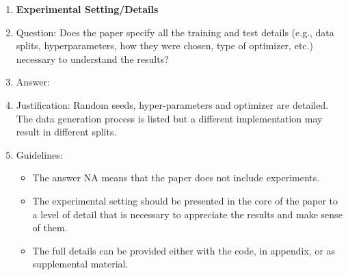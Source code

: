 \documentclass{article}
\theoremstyle{plain}
\theoremstyle{definition}
\theoremstyle{remark}
\begin{document}
\begin{enumerate}
\item {\bf Experimental Setting/Details}
    \item[] Question: Does the paper specify all the training and test details (e.g., data splits, hyperparameters, how they were chosen, type of optimizer, etc.) necessary to understand the results?
    \item[] Answer: \answerYes{} %
    \item[] Justification: Random seeds, hyper-parameters and optimizer are detailed. The data generation process is listed but a different implementation may result in different splits. 
    \item[] Guidelines:
    \begin{itemize}
        \item The answer NA means that the paper does not include experiments.
        \item The experimental setting should be presented in the core of the paper to a level of detail that is necessary to appreciate the results and make sense of them.
        \item The full details can be provided either with the code, in appendix, or as supplemental material.
    \end{itemize}


\end{enumerate}
\end{document}
